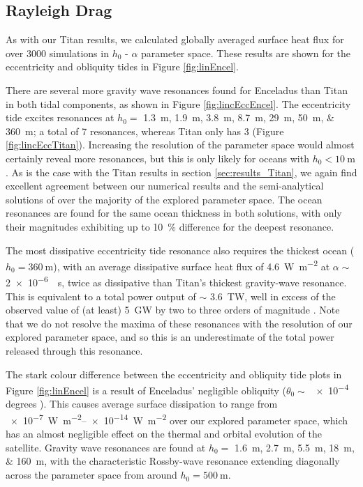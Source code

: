 \subsection{Rayleigh Drag} \label{sec:ray_enc}

As with our Titan results, we calculated globally averaged surface heat flux for over 3000 simulations in $h_0$ - $\alpha$ parameter space. These results are shown for the eccentricity and obliquity tides in Figure \ref{fig:linEncel}.

There are several more gravity wave resonances found for Enceladus than Titan in both tidal components, as shown in Figure \ref{fig:lincEccEncel}. The eccentricity tide excites resonances at $h_0 =$ \SIlist{1.3;1.9;3.8;8.7;29;50;360}{m}; a total of 7 resonances, whereas Titan only has 3 (Figure \ref{fig:lincEccTitan}). Increasing the resolution of the parameter space would almost certainly reveal more resonances, but this is only likely for oceans with $h_0 < \SI{10}{\metre}$. As is the case with the Titan results in section \ref{sec:results_Titan}, we again find excellent agreement between our numerical results and the semi-analytical solutions of \citet{matsuyama2014tidal} over the majority of the explored parameter space. The ocean resonances are found for the same ocean thickness in both solutions, with only their magnitudes exhibiting up to \SI{10}{\percent} difference for the deepest resonance.

The most dissipative eccentricity tide resonance also requires the thickest ocean ($h_0 = \SI{360}{\metre}$), with an average dissipative surface heat flux of \SI{4.6}{\watt\per\square\metre} at $\alpha\sim$ \SI{2e-6}{\per\second}, twice as dissipative than Titan's thickest gravity-wave resonance. This is equivalent to a total power output of $\sim$ \SI{3.6}{\tera\watt}, well in excess of the observed value of (at least) \SI{5}{\giga\watt} by two to three orders of magnitude \citep{spencer2006cassini,howett2011high, spencer2013new}. Note that we do not resolve the maxima of these resonances with the resolution of our explored parameter space, and so this is an underestimate of the total power released through this resonance.

The stark colour difference between the eccentricity and obliquity tide plots in Figure \ref{fig:linEncel} is a result of Enceladus' negligible obliquity ($\theta_0 \sim$ \num{e-4} degrees \citep{chen2011obliquity, baland2016obliquity}). This causes average surface dissipation to range from \SIrange{e-7}{e-14}{\watt\per\square\metre} over our explored parameter space, which has an almost negligible effect on the thermal and orbital evolution of the satellite. Gravity wave resonances are found at $h_0 =$ \SIlist{1.6;2.7;5.5;18;160}{\metre}, with the characteristic Rossby-wave resonance extending diagonally across the parameter space from around $h_0 = \SI{500}{\metre}$.

